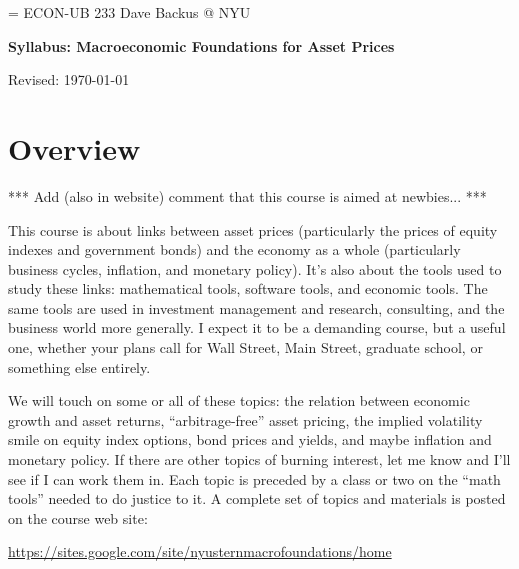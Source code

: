 \documentclass[11pt]{article}
\begin{document}
\parskip=\bigskipamount
\parindent=0.0in
\thispagestyle{empty}
{\large ECON-UB 233 \hfill Dave Backus @ NYU}

\bigskip\bigskip
\centerline{\Large \bf Syllabus:  Macroeconomic Foundations for Asset Prices}
\centerline{Revised: \today}


\section*{Overview}

*** Add (also in website) comment that this course is aimed
at newbies...  ***

This course is about links between asset prices
(particularly the prices of equity indexes and government bonds)
and the economy as a whole (particularly business cycles, inflation, and monetary policy).
It's also about the tools used to study these links:
mathematical tools, software tools, and economic tools.
The same tools are used in
investment management and research, consulting, and the business world more generally.
I expect it to be a demanding course, but a useful one,
whether your plans call for Wall Street, Main Street,
graduate school, or something else entirely.

\begin{comment}
The skills we'll develop to collect, manipulate,
and interpret data
are among the most valuable you can have in modern life,
and they're not easy to learn on your own.
You will learn to think about data from the
perspective of quantitative models,
to use professional software
(Matlab, not Excel!) to manipulate data,
and to use data to apply and develop models.
Our applications are to macroeconomics and finance,
but the skills you acquire here are general ones.
\end{comment}

We will touch on some or all of these topics:
the relation between economic growth and asset returns,
``arbitrage-free'' asset pricing,
the implied volatility smile on equity index options,
bond prices and yields, and maybe inflation and monetary policy.
If there are other topics of burning interest, let me know
and I'll see if I can work them in.
Each topic is preceded by a class or two on
the ``math tools'' needed to do justice to it.
A complete set of topics and materials is posted on
the course web site:

\vspace*{\parskip}
\centerline{\url{https://sites.google.com/site/nyusternmacrofoundations/home}}
\end{document}
